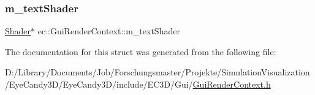 \mbox{\label{structec_1_1_gui_render_context_aa42aa86b9e3f12b973329494a3c89f90}} 
\subsubsection{\texorpdfstring{m\+\_\+text\+Shader}{m\_textShader}}
{\footnotesize\ttfamily \mbox{\hyperlink{classec_1_1_shader}{Shader}}$\ast$ ec\+::\+Gui\+Render\+Context\+::m\+\_\+text\+Shader}



The documentation for this struct was generated from the following file\+:\begin{DoxyCompactItemize}
\item 
D\+:/\+Library/\+Documents/\+Job/\+Forschungsmaster/\+Projekte/\+Simulation\+Visualization/\+Eye\+Candy3\+D/\+Eye\+Candy3\+D/include/\+E\+C3\+D/\+Gui/\mbox{\hyperlink{_gui_render_context_8h}{Gui\+Render\+Context.\+h}}\end{DoxyCompactItemize}
